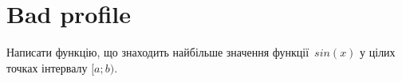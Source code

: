 \documentclass[12pt]{article}
\begin{document}
\section*{Bad profile}

Написати функцію, що знаходить найбільше значення функції~$sin(x)$ у цілих точках інтервалу $[a; b)$.


\end{document}
